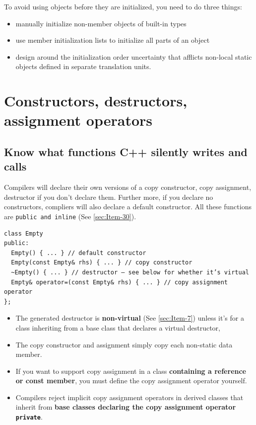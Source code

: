 To avoid using objects before they are initialized, you need to do
three things:
\begin{itemize}
\item manually initialize non-member objects of built-in types
\item use member initialization lists to initialize all parts of an
  object
\item design around the initialization order uncertainty that afflicts
  non-local static objects defined in separate translation units.
\end{itemize}

\newpage
\section{Constructors, destructors, assignment operators}

\subsection{Know what functions C++ silently writes and calls}
\label{sec:Item-5}

Compilers will declare their own versions of a copy constructor, copy
assignment, destructor if you don't declare them. Further more, if you
declare no constructors, compliers will also declare a default
constructor. All these functions are \texttt{public and inline} (See
\ref{sec:Item-30}).
\begin{verbatim}
class Empty
public:
  Empty() { ... } // default constructor
  Empty(const Empty& rhs) { ... } // copy constructor
  ~Empty() { ... } // destructor — see below for whether it’s virtual
  Empty& operator=(const Empty& rhs) { ... } // copy assignment operator
};
\end{verbatim}
\begin{itemize}
\item The generated destructor is \textbf{non-virtual} (See \ref{sec:Item-7})
  unless it's for a class inheriting from a base class that declares a
  virtual destructor,
\item The copy constructor and assignment simply copy each non-static
  data member.
\item If you want to support copy assignment in a class \textbf{containing a
  reference or const member}, you must define the copy assignment
  operator yourself.
\item Compilers reject implicit copy assignment operators in derived
  classes that inherit from \textbf{base classes declaring the copy assignment
  operator \texttt{private}}.
\end{itemize}

